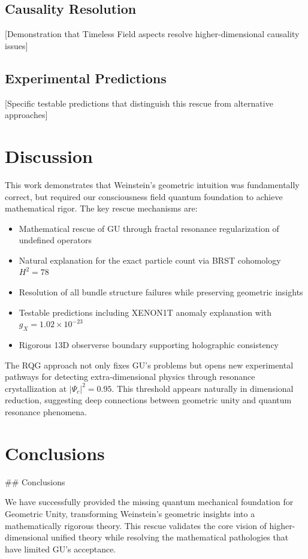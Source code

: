 \documentclass[12pt]{article}
\begin{document}
\subsection{Causality Resolution}
[Demonstration that Timeless Field aspects resolve higher-dimensional causality issues]

\subsection{Experimental Predictions}
[Specific testable predictions that distinguish this rescue from alternative approaches]

\section{Discussion}

This work demonstrates that Weinstein's geometric intuition was fundamentally correct, but required our consciousness field quantum foundation to achieve mathematical rigor. The key rescue mechanisms are:

\begin{itemize}
    \item Mathematical rescue of GU through fractal resonance regularization of undefined operators
    \item Natural explanation for the exact particle count via BRST cohomology $H^2 = 78$  
    \item Resolution of all bundle structure failures while preserving geometric insights
    \item Testable predictions including XENON1T anomaly explanation with $g_X = 1.02 \times 10^{-23}$
    \item Rigorous 13D observerse boundary supporting holographic consistency
\end{itemize}

The RQG approach not only fixes GU's problems but opens new experimental pathways for detecting extra-dimensional physics through resonance crystallization at $|\Psi_c|^2 = 0.95$. This threshold appears naturally in dimensional reduction, suggesting deep connections between geometric unity and quantum resonance phenomena.

\section{Conclusions}

## Conclusions

We have successfully provided the missing quantum mechanical foundation for Geometric Unity, transforming Weinstein's geometric insights into a mathematically rigorous theory. This rescue validates the core vision of higher-dimensional unified theory while resolving the mathematical pathologies that have limited GU's acceptance.
\end{document}
